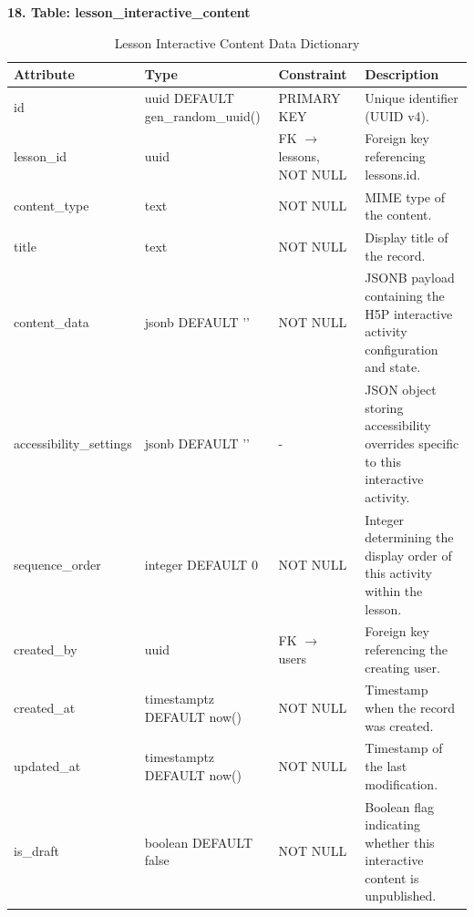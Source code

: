 \documentclass[12pt, oneside]{article} %
\newcommand{\tabbreak}{\hyphenpenalty=200\exhyphenpenalty=200\tolerance=4000\hbadness=10000\hspace{0pt}}
\begin{document}
\textbf{18. Table: lesson\_interactive\_content}

\begin{table}[H]
\caption{Lesson Interactive Content Data Dictionary}
\label{tab:dd_lesson_interactive_content}
\vspace{-4mm}
\begin{center}
\renewcommand{\arraystretch}{1.15}
\scriptsize
\begin{tabular}{|>{\raggedright\arraybackslash\tabbreak}p{2.67cm}|>{\raggedright\arraybackslash\tabbreak}p{2.93cm}|>{\raggedright\arraybackslash\tabbreak}p{2.67cm}|>{\raggedright\arraybackslash\tabbreak}p{4.51cm}|}
\hline
\textbf{Attribute} & \textbf{Type} & \textbf{Constraint} & \textbf{Description} \\ \hline
id & uuid DEFAULT gen\_random\_uuid() & PRIMARY KEY & Unique identifier (UUID v4). \\ \hline
lesson\_id & uuid & FK $\rightarrow$ lessons, NOT NULL & Foreign key referencing lessons.id. \\ \hline
content\_type & text & NOT NULL & MIME type of the content. \\ \hline
title & text & NOT NULL & Display title of the record. \\ \hline
content\_data & jsonb DEFAULT '{}' & NOT NULL & JSONB payload containing the H5P interactive activity configuration and state. \\ \hline
accessibility\_settings & jsonb DEFAULT '{}' & - & JSON object storing accessibility overrides specific to this interactive activity. \\ \hline
sequence\_order & integer DEFAULT 0 & NOT NULL & Integer determining the display order of this activity within the lesson. \\ \hline
created\_by & uuid & FK $\rightarrow$ users & Foreign key referencing the creating user. \\ \hline
created\_at & timestamptz DEFAULT now() & NOT NULL & Timestamp when the record was created. \\ \hline
updated\_at & timestamptz DEFAULT now() & NOT NULL & Timestamp of the last modification. \\ \hline
is\_draft & boolean DEFAULT false & NOT NULL & Boolean flag indicating whether this interactive content is unpublished. \\ \hline
\end{tabular}
\end{center}
\end{table}
\end{document}
